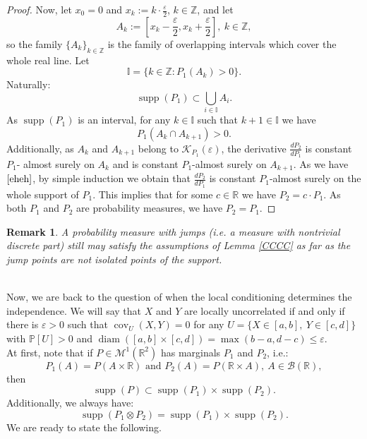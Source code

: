 \documentclass[sn-mathphys,Numbered,11pt]{sn-jnl}%
\theoremstyle{thmstyleone}%
\newtheorem{remark}{Remark}%
\newcommand{\mcl}{\mathcal}
\newcommand{\eps}{\varepsilon}
\newcommand{\R}{\mathbb{R}}
\newcommand{\PP}{\mathbb{P}}
\newcommand{\B}{\mathcal{B}(\R)}
\newcommand{\KK}{\mathcal{K}}
\newcommand{\supp}{\operatorname{supp}}
\newcommand{\cov}{\operatorname{cov}}
\newcommand{\diam}{\operatorname{diam}}
\begin{document}
\begin{proof}
Now, let $x_0=0$ and $x_k:=k\cdot\frac{\eps}{2}$, $k\in\mathbb{Z}$, and let 
$$A_k:=[x_k-\frac{\eps}{2},x_k+\frac{\eps}{2}],\ k\in\mathbb{Z},$$
so the family $\{A_k\}_{k\in\mathbb{Z}}$ is the family of overlapping intervals which cover the whole real line. Let
$$\mathbb{I}=\{k\in \mathbb{Z}\colon P_1(A_k)>0 \}.$$
Naturally:  
$$ \operatorname{supp}(P_1) \subset \bigcup\limits_{i\in\mathbb{I}} A_i.$$
 As $\operatorname{supp}(P_1)$ is an interval, for any $k\in \mathbb{I}$ such that $k+1\in\mathbb{I}$ we have 
\begin{equation}\label{eheh}
P_1(A_k\cap A_{k+1})>0.
\end{equation}
 Additionally, as $A_k$ and  $A_{k+1}$ belong to $\KK_{P_1}(\eps)$,  the derivative $\frac{dP_2}{dP_1}$ is constant $P_1$- almost surely on $A_k$ and is constant $P_1$-almost surely on $A_{k+1}$. As we have $\eqref{eheh}$, by simple induction we obtain that $\frac{dP_2}{dP_1}$ is constant $P_1$-almost surely on the whole support  of $P_1$. This implies that for some $c\in\R$ we have $P_2=c\cdot P_1$. As both $P_1$ and $P_2$ are probability measures, we have $P_2=P_1$.  

\end{proof}

\begin{remark}
 A probability measure with jumps (i.e. a measure with nontrivial discrete part) still may satisfy the assumptions of Lemma \ref{CCCC}  as far as the jump points are not isolated points of the support. 
\end{remark}
\ \\
Now, we are back to the question of when the local conditioning determines the independence. We will say that $X$ and $Y$ are locally uncorrelated if and only if there is $\eps>0$ such that $\cov_U(X,Y)=0$ for any $U=\{X\in[a,b],\ Y\in[c,d]\}$ with $\PP[U]>0$ and $\diam([a,b]\times[c,d])=\max(b-a,d-c)\leq\eps$.\\

At first, note that if $P\in\mcl{M}^1(\R^2)$ has marginals $P_1$ and $P_2$, i.e.:
$$P_1(A)=P(A\times\R)\mbox{ and }P_2(A)=P(\R\times A), \ A\in\B,$$
then
$$\supp(P)\subset \supp(P_1)\times \supp(P_2).$$
Additionally, we always have:
$$\supp(P_1\otimes P_2) = \supp(P_1)\times \supp(P_2).$$
 We are ready to state the following.



\end{document}
